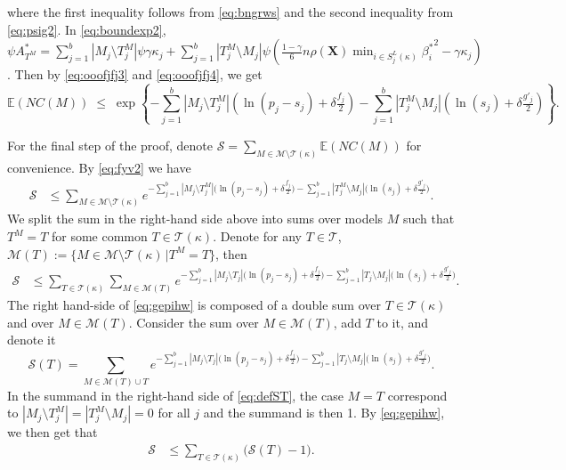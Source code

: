 \documentclass[
  12pt]{article}
\newcommand{\E}{\mathbb{E}}
\newcommand{\M}{\mathcal{M}}
\newcommand{\T}{\mathcal{T}}
\newcommand{\bX}{\mathbf{X}}
\begin{document}
where the first inequality follows from \eqref{eq:bngrws} and the second inequality from \eqref{eq:psig2}. In \eqref{eq:boundexp2}, $\psi A^*_{T^M}=\sum_{j=1}^b|M_j \setminus T^M_j|\psi\gamma\kappa_j + \sum_{j=1}^b |T^M_j \setminus M_j|\psi\left(\tfrac{1-\gamma}{6} n \rho(\bX) \min_{i\in S^{L}_j(\kappa)}{\beta^*_i}^{2} - \gamma\kappa_j\right)$. Then by \eqref{eq:ooofjfj3} and \eqref{eq:ooofjfj4}, we get
\begin{equation}\label{eq:fyv2}
\E(NC(M))\;\leq\;\exp\left\{- \sum_{j=1}^b |M_j\setminus T^M_j|(\ln(p_j-s_j)+\delta \tfrac{f_j}{2})-\sum_{j=1}^b |T^M_j\setminus M_j|(\ln(s_j)+\delta \tfrac{g'_j}{2})\right\}.
\end{equation}

For the final step of the proof, denote $\mathcal{S}= \sum_{M \in \M\setminus \T(\kappa)} \E\left(NC(M)\right)$ for convenience. By \eqref{eq:fyv2} we have
\begin{align*}
    \mathcal{S} &\leq \sum_{M \in \M\setminus \T(\kappa)}e^{- \sum_{j=1}^b |M_j\setminus T^M_j|\big(\ln(p_j-s_j)+\delta \tfrac{f_j}{2}\big)-\sum_{j=1}^b |T^M_j\setminus M_j|\big(\ln(s_j)+\delta \tfrac{g'_j}{2}\big)}.
\end{align*}
We split the sum in the right-hand side above into sums over models $M$ %
such that $T^M=T$ for some common $T\in \T(\kappa)$. Denote for any $T\in \T$,\, $\M(T):=\{M \in \M\setminus \T(\kappa) \,| T^M=T\}$, then
\begin{align}\label{eq:gepihw}
    \mathcal{S} &\leq \sum_{T \in \T(\kappa)}\sum_{M \in \M(T)}e^{- \sum_{j=1}^b |M_j\setminus T_j|\big(\ln(p_j-s_j)+\delta \tfrac{f_j}{2}\big)-\sum_{j=1}^b |T_j\setminus M_j|\big(\ln(s_j)+\delta \tfrac{g'_j}{2}\big)}.
\end{align}
The right hand-side of \eqref{eq:gepihw} is composed of a double sum over $T \in \T(\kappa)$ and over $M \in \M(T)$. Consider the sum over $M \in \M(T)$, add $T$ to it, and denote it
\begin{equation}\label{eq:defST}
  \mathcal{S}(T)=\sum_{M \in \M(T) \cup T}e^{- \sum_{j=1}^b |M_j\setminus T_j|\big(\ln(p_j-s_j)+\delta \tfrac{f_j}{2}\big)-\sum_{j=1}^b |T_j\setminus M_j|\big(\ln(s_j)+\delta \tfrac{g'_j}{2}\big)}.
\end{equation}
In the summand in the right-hand side of \eqref{eq:defST}, the case $M=T$ correspond to $|M_j\setminus T^M_j|=|T^M_j\setminus M_j|=0$ for all $j$ and the summand is then 1.
By \eqref{eq:gepihw}, we then get that
\begin{align}\label{eq:gepihw2}
    \mathcal{S} &\leq \sum_{T \in \T(\kappa)}\big(\mathcal{S}(T)-1\big).
\end{align}
\end{document}
